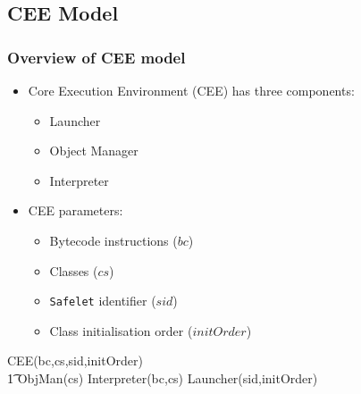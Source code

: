 \documentclass{beamer}
\begin{document}
\subsection{CEE Model}

\begin{frame}
  \frametitle{Overview of CEE model}
  \begin{itemize}
  \item Core Execution Environment (CEE) has three components:
    \begin{itemize}
    \item Launcher
    \item Object Manager
    \item Interpreter 
    
    \end{itemize}
  \item CEE parameters:
    \begin{itemize}
    \item Bytecode instructions ($bc$)
    \item Classes ($cs$)
    \item \texttt{Safelet} identifier ($sid$)
    \item Class initialisation order ($initOrder$)
    \end{itemize}
  \end{itemize}
  \vspace{-0.8cm}
  {\setlength{\zedindent}{2mm}
    \setlength{\zedleftsep}{2mm}
    \setlength{\zedtab}{0.7em}
    \begin{circus}
      \circprocess CEE(bc,cs,sid,initOrder) \circdef \\
      \t1 ObjMan(cs) \parallel Interpreter(bc,cs)  \parallel Launcher(sid,initOrder)
    \end{circus}}
\end{frame}
\end{document}
